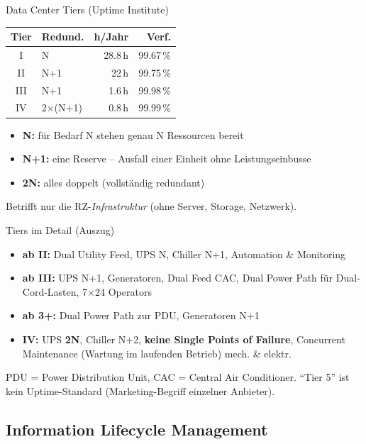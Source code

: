 \documentclass[a4paper, fontsize=7pt]{scrartcl}
\renewcommand*{\arraystretch}{1.5}  %
\begin{document}
\begin{mainbox}{Data Center Tiers (Uptime Institute)}
\renewcommand*{\arraystretch}{1.15}
\begin{center}
\setlength{\tabcolsep}{4pt}
\begin{tabular}{c|l|r|r}
\textbf{Tier} & \textbf{Redund.} & \textbf{h/Jahr} & \textbf{Verf.} \\
\hline
I & N & 28.8\,h & 99.67\,\% \\
II & N+1 & 22\,h & 99.75\,\% \\
III & N+1 & 1.6\,h & 99.98\,\% \\
IV & 2$\times$(N+1) & 0.8\,h & 99.99\,\% \\
\end{tabular}
\end{center}
\begin{itemize}
    \item \textbf{N:} für Bedarf N stehen genau N Ressourcen bereit
    \item \textbf{N+1:} eine Reserve -- Ausfall einer Einheit ohne
          Leistungseinbusse
    \item \textbf{2N:} alles doppelt (vollständig redundant)
\end{itemize}
Betrifft nur die RZ-\emph{Infrastruktur} (ohne Server, Storage, Netzwerk).
\end{mainbox}

\begin{subbox}{Tiers im Detail (Auszug)}
\begin{itemize}
    \item \textbf{ab II:} Dual Utility Feed, UPS N, Chiller N+1,
          Automation \& Monitoring
    \item \textbf{ab III:} UPS N+1, Generatoren, Dual Feed CAC,
          Dual Power Path für Dual-Cord-Lasten, 7$\times$24 Operators
    \item \textbf{ab 3+:} Dual Power Path zur PDU, Generatoren N+1
    \item \textbf{IV:} UPS \textbf{2N}, Chiller N+2,
          \textbf{keine Single Points of Failure}, Concurrent Maintenance
          (Wartung im laufenden Betrieb) mech. \& elektr.
\end{itemize}
PDU = Power Distribution Unit, CAC = Central Air Conditioner.
``Tier 5'' ist kein Uptime-Standard (Marketing-Begriff einzelner Anbieter).
\end{subbox}

\subsection{Information Lifecycle Management}
\end{document}
